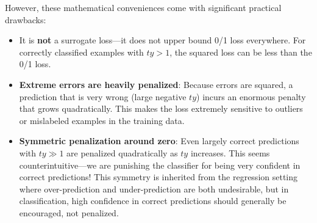 However, these mathematical conveniences come with significant practical drawbacks:

\begin{itemize}
\item It is \textbf{not} a surrogate loss—it does not upper bound 0/1 loss everywhere. For correctly classified examples with $ty > 1$, the squared loss can be less than the 0/1 loss.

\item \textbf{Extreme errors are heavily penalized}: Because errors are squared, a prediction that is very wrong (large negative $ty$) incurs an enormous penalty that grows quadratically. This makes the loss extremely sensitive to outliers or mislabeled examples in the training data.

\item \textbf{Symmetric penalization around zero}: Even largely correct predictions with $ty \gg 1$ are penalized quadratically as $ty$ increases. This seems counterintuitive—we are punishing the classifier for being very confident in correct predictions! This symmetry is inherited from the regression setting where over-prediction and under-prediction are both undesirable, but in classification, high confidence in correct predictions should generally be encouraged, not penalized.
\end{itemize}

\begin{center}
\end{center}

